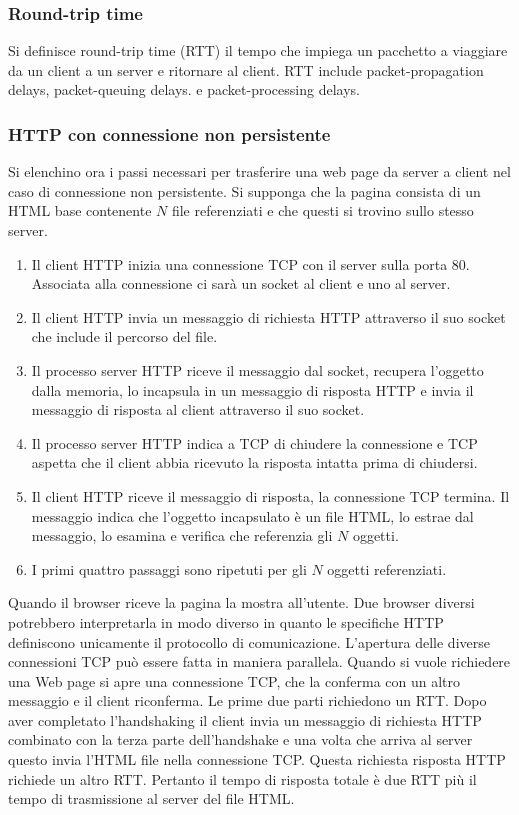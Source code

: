 \subsubsection{Round-trip time}
 Si definisce round-trip time (RTT) il tempo che impiega un pacchetto a viaggiare da un client a un server e ritornare al client. RTT include packet-propagation delays, packet-queuing delays. e packet-processing 
 delays. 
\subsubsection{HTTP con connessione non persistente}
Si elenchino ora i passi necessari per trasferire una web page da server a client nel caso di connessione non persistente. Si supponga che la pagina consista di un HTML base contenente $N$ file referenziati e 
che questi si trovino sullo stesso server.
\begin{enumerate}
\item Il client HTTP inizia una connessione TCP con il server sulla porta $80$. Associata alla connessione ci sar\`a un socket al client e uno al server.
\item Il client HTTP invia un messaggio di richiesta HTTP attraverso il suo socket che include il percorso del file.
\item Il processo server HTTP riceve il messaggio dal socket, recupera l'oggetto dalla memoria, lo incapsula in un messaggio di risposta HTTP e invia il messaggio di risposta al client attraverso il suo socket.
\item Il processo server HTTP indica a TCP di chiudere la connessione e TCP aspetta che il client abbia ricevuto la risposta intatta prima di chiudersi.
\item Il client HTTP riceve il messaggio di risposta, la connessione TCP termina. Il messaggio indica che l'oggetto incapsulato \`e un file HTML, lo estrae dal messaggio, lo esamina e verifica che referenzia gli
$N$ oggetti.
\item I primi quattro passaggi sono ripetuti per gli $N$ oggetti referenziati.
\end{enumerate}
Quando il browser riceve la pagina la mostra all'utente. Due browser diversi potrebbero interpretarla in modo diverso in quanto le specifiche HTTP definiscono unicamente il protocollo di comunicazione. 
L'apertura delle diverse connessioni TCP pu\`o essere fatta in maniera parallela. Quando si vuole richiedere una Web page si apre una connessione TCP, che la conferma con un altro messaggio e il client 
riconferma. Le prime due parti richiedono un RTT. Dopo aver completato l'handshaking il client invia un messaggio di richiesta HTTP combinato con la terza parte dell'handshake e una volta che arriva al server
questo invia l'HTML file nella connessione TCP. Questa richiesta risposta HTTP richiede un altro RTT. Pertanto il tempo di risposta totale \`e due RTT pi\`u il tempo di trasmissione al server del file HTML.
